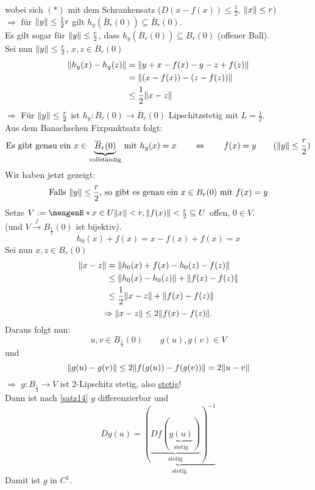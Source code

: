 wobei sich $(*)$ mit dem Schrankensatz ($D(x-f(x))\leq \frac{1}{2}$, $\norm{x}\leq r$) \\
$\Rightarrow$ für $\norm{y} \leq \frac{1}{2}r$ gilt $h_y(\overline{B}_r(0))\subseteq \overline{B}_r(0)$. \\
Es gilt sogar für $\norm{y}\leq \frac{r}{2}$, dass $h_y(\overline{B}_r(0)) \subseteq B_r(0)$ (offener Ball). \\
Sei nun $\norm{y}\leq \frac{r}{2}$, $x,z \in \overline{B}_r(0)$
\begin{align*}
	\norm{h_y(x)-h_y(z)} &= \norm{y+x-f(x)-y-z+f(z)} \\
	&= \norm{(x-f(x))-(z-f(z))} \\
	&\leq \frac{1}{2}\norm{x-z}
\end{align*}   
$\Rightarrow$ Für $\norm{y}\leq \frac{r}{2}$ ist $h_y: \overline{B}_r(0) \to \overline{B}_r(0)$ Lipschitzstetig mit $L=\frac{1}{2}$. \\
Aus dem Banachschen Fixpunktsatz folgt:
\[
	\text{Es gibt genau ein } x \in \underset{\text{vollständig}}{\underbrace{\overline{B}_r(0)}} \text{ mit } h_y(x)=x \qquad \Leftrightarrow \qquad f(x)=y \qquad (\norm{y} \leq \frac{r}{2})
\]
Wir haben jetzt gezeigt:
\[
	\text{Falls }\norm{y}\leq \frac{r}{2}\text{, so gibt es genau ein }x \in B_r(0) \text{ mit } f(x)=y
\]
Setze $V:= \set[x \in U]{\norm{x}<r,\norm{f(x)}<\frac{r}{2}} \subseteq U$ offen, $0 \in V$. \\
(und $V \stackrel{f}{\longrightarrow} B_{\frac{1}{2}}(0)$ ist bijektiv). 
\[
	h_0(x)+f(x)=x-f(x)+f(x) = x
\]
Sei nun $x,z \in B_r(0)$ 
\begin{align*}
	\norm{x-z} &= \norm{h_0(x)+f(x)- h_0(z)-f(z)} \\
	&\leq \norm{h_0(x)-h_0(z)}+ \norm{f(x)-f(z)} \\
	&\leq \frac{1}{2} \norm{x-z} + \norm{f(x)-f(z)}
\end{align*}
\[
\Rightarrow \norm{x-z} \leq 2 \norm{f(x)-f(z)}.	
\]
Daraus folgt nun:
\[
	u,v \in B_{\frac{1}{2}}(0) \qquad g(u),g(v) \in V 
\]
und
\[
	\norm{g(u)-g(v)} \leq 2 \norm{f(g(u))-f(g(v))} = 2 \norm{u-v}
\]
$\Rightarrow$ $g: B_{\frac{1}{2}} \to V$ ist $2$-Lipschitz stetig, also \underline{stetig}! \\
Dann ist nach \ref{satz14} $g$ differenzierbar und
\[
	Dg(u)= \underset{\text{stetig}}{\underbrace{( \underset{\text{stetig}}{\underbrace{ Df( \underset{\text{stetig}}{\underbrace{g(u)}} )}} )^{-1}}}
\]
Damit ist $g$ in $C^1$. \bewende
